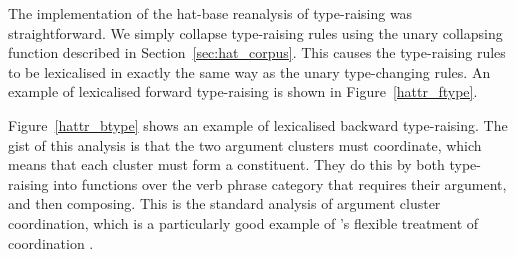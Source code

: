 The implementation of the hat-base reanalysis of type-raising was
straightforward. We simply collapse type-raising rules using the unary
collapsing function described in Section~\ref{sec:hat_corpus}. This causes the
type-raising rules to be lexicalised in exactly the same way as the unary
type-changing rules. An example of lexicalised forward type-raising is shown
in Figure~\ref{hattr_ftype}.

Figure~\ref{hattr_btype} shows an example of lexicalised backward type-raising.
The gist of this analysis is that the two argument clusters must coordinate,
which means that each cluster must form a constituent. They do this by both
type-raising into functions over the verb phrase category that requires their
argument, and then composing. This is the standard \ccg analysis of argument
cluster coordination, which is a particularly good example of \ccg's flexible
treatment of coordination \citep{steedman:00}.

\begin{sidewaysfigure}
 \centering
{}
\caption{Example of backward type-raising lexicalised with a hat
category.\label{hattr_btype}}
\end{sidewaysfigure}


